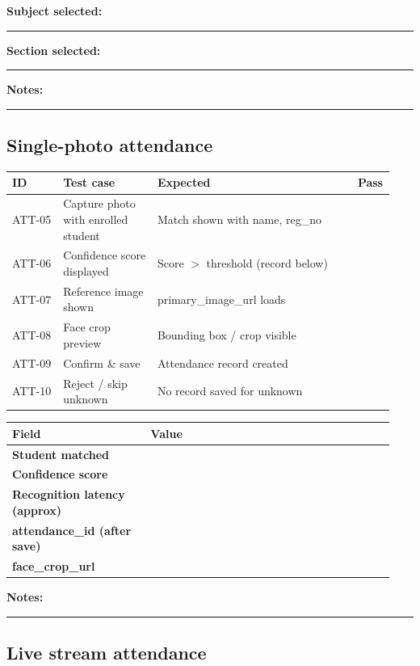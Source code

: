 \documentclass[11pt,a4paper,oneside]{article}
\makeatletter
\newcommand{\chk}{\fbox{\rule{0pt}{1.05ex}\rule{1.05ex}{0pt}}}
\newcommand{\fillin}[1][3.5cm]{\rule{#1}{0.4pt}}
\newcommand{\fillinlong}{\rule{0.72\textwidth}{0.4pt}}
\newcommand{\notesblock}{\par\smallskip\noindent\textbf{Notes:}\ \fillinlong\par\smallskip}
\newcommand{\fieldline}[1]{\par\smallskip\noindent\textbf{#1}\ \fillin\par}
\newenvironment{fieldtable}{%
  \smallskip\small
\begin{tabular}{@{}>{\raggedright\arraybackslash}p{0.34\linewidth} >{\raggedright\arraybackslash}p{0.60\linewidth}@{}}
  \toprule
  \textbf{Field} & \textbf{Value} \\
  \midrule
}{%
  \bottomrule
  \end{tabular}
  \smallskip
}
\newcommand{\tcheadfour}{%
  \toprule
  \textbf{ID} & \textbf{Test case} & \textbf{Expected} & \textbf{Pass} \\
  \midrule
}
\makeatother
\begin{document}
\fieldline{Subject selected:}
\fieldline{Section selected:}
\notesblock

\subsection{Single-photo attendance}

\small
\begin{tabular}{@{}>{\raggedright\arraybackslash}p{0.13\linewidth} >{\raggedright\arraybackslash}p{0.24\linewidth} >{\raggedright\arraybackslash}p{0.51\linewidth} >{\centering\arraybackslash}p{0.06\linewidth}@{}}
  \tcheadfour
  ATT-05 & Capture photo with enrolled student & Match shown with name, reg\_no     & \chk \\
  ATT-06 & Confidence score displayed          & Score $>$ threshold (record below) & \chk \\
  ATT-07 & Reference image shown               & primary\_image\_url loads          & \chk \\
  ATT-08 & Face crop preview                   & Bounding box / crop visible        & \chk \\
  ATT-09 & Confirm \& save                       & Attendance record created          & \chk \\
  ATT-10 & Reject / skip unknown               & No record saved for unknown        & \chk \\
  \bottomrule
\end{tabular}
\normalsize

\begin{fieldtable}
\textbf{Student matched}           & \\
\textbf{Confidence score}          & \\
\textbf{Recognition latency (approx)} & \\
\textbf{attendance\_id (after save)}  & \\
\textbf{face\_crop\_url}           & \\
\end{fieldtable}

\notesblock

\subsection{Live stream attendance}
\end{document}
